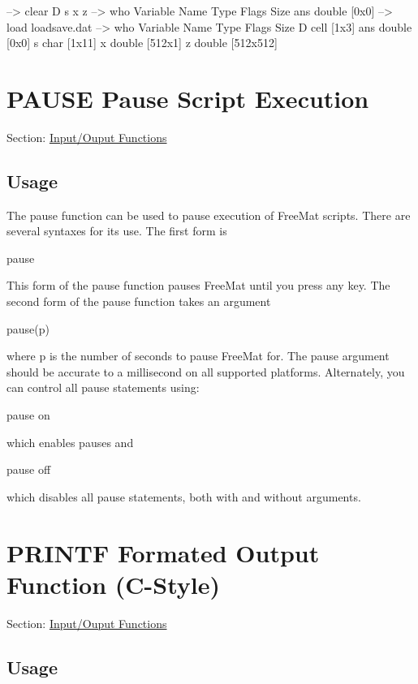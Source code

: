 \begin{DoxyVerbInclude}
--> clear D s x z
--> who
  Variable Name       Type   Flags             Size
            ans    double                    [0x0]
--> load loadsave.dat
--> who
  Variable Name       Type   Flags             Size
              D      cell                    [1x3]
            ans    double                    [0x0]
              s      char                    [1x11]
              x    double                    [512x1]
              z    double                    [512x512]
\end{DoxyVerbInclude}
 \hypertarget{io_pause}{}\section{P\-A\-U\-S\-E Pause Script Execution}\label{io_pause}
Section\-: \hyperlink{sec_io}{Input/\-Ouput Functions} \hypertarget{vtkwidgets_vtkxyplotwidget_Usage}{}\subsection{Usage}\label{vtkwidgets_vtkxyplotwidget_Usage}
The {\ttfamily pause} function can be used to pause execution of Free\-Mat scripts. There are several syntaxes for its use. The first form is \begin{DoxyVerb}   pause
\end{DoxyVerb}
 This form of the {\ttfamily pause} function pauses Free\-Mat until you press any key. The second form of the {\ttfamily pause} function takes an argument \begin{DoxyVerb}   pause(p)
\end{DoxyVerb}
 where {\ttfamily p} is the number of seconds to pause Free\-Mat for. The pause argument should be accurate to a millisecond on all supported platforms. Alternately, you can control all {\ttfamily pause} statements using\-: \begin{DoxyVerb}   pause on
\end{DoxyVerb}
 which enables pauses and \begin{DoxyVerb}   pause off
\end{DoxyVerb}
 which disables all {\ttfamily pause} statements, both with and without arguments. \hypertarget{io_printf}{}\section{P\-R\-I\-N\-T\-F Formated Output Function (C-\/\-Style)}\label{io_printf}
Section\-: \hyperlink{sec_io}{Input/\-Ouput Functions} \hypertarget{vtkwidgets_vtkxyplotwidget_Usage}{}\subsection{Usage}\label{vtkwidgets_vtkxyplotwidget_Usage}
